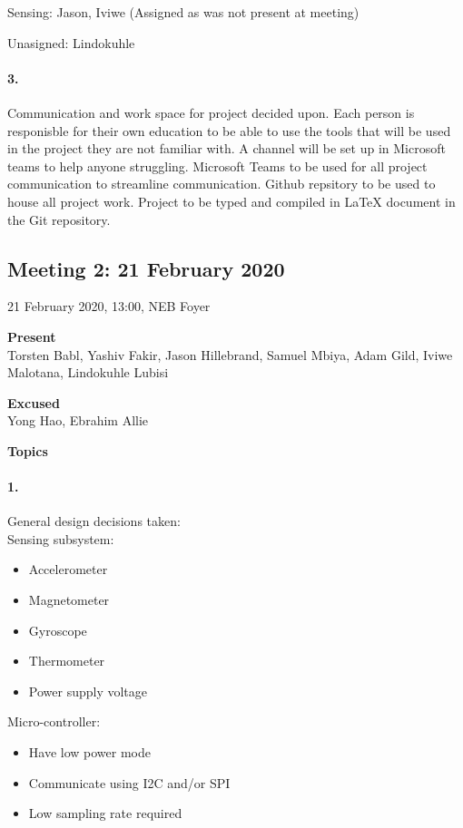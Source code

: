 \documentclass[12pt]{article}
\begin{document}
Sensing: Jason, Iviwe (Assigned as was not present at meeting)
  
Unasigned: Lindokuhle

\paragraph[short]{3.} Communication and work space for project decided upon. Each person is responisble for their own education to be able to use the tools that will be used in the project they are not familiar with. A channel will be set up in Microsoft teams to help anyone struggling.  
Microsoft Teams to be used for all project communication to streamline communication.
Github repsitory to be used to house all project work.
Project to be typed and compiled in LaTeX document in the Git repository.
\newpage

\subsection{Meeting 2: 21 February 2020}
21 February 2020, 13:00, NEB Foyer

\textbf{Present}\\
Torsten Babl, Yashiv Fakir, Jason Hillebrand, Samuel Mbiya, Adam Gild, Iviwe Malotana, Lindokuhle Lubisi

\textbf{Excused}\\
Yong Hao, Ebrahim Allie

\textbf{Topics}
\paragraph[short]{1.} General design decisions taken:\\
Sensing subsystem:
\begin{itemize}
  \item Accelerometer
  \item Magnetometer
  \item Gyroscope
  \item Thermometer
  \item Power supply voltage
\end{itemize}

Micro-controller:
\begin{itemize}
  \item Have low power mode
  \item Communicate using I2C and/or SPI
  \item Low sampling rate required
\end{itemize}
\end{document}
